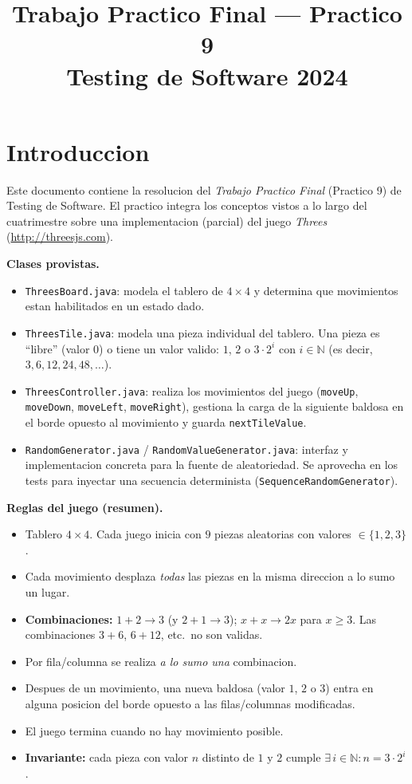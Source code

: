 \documentclass[12pt,a4paper]{article}
\title{\textbf{Trabajo Practico Final --- Practico 9}\\Testing de Software 2024}
\author{}
\date{}
\begin{document}
\maketitle
\tableofcontents
\newpage

\section*{Introduccion}

Este documento contiene la resolucion del \textit{Trabajo Practico Final} (Practico 9) de
Testing de Software. El practico integra los conceptos vistos a lo largo del cuatrimestre
sobre una implementacion (parcial) del juego \emph{Threes} (\url{http://threesjs.com}).

\textbf{Clases provistas.}

\begin{itemize}
  \item \texttt{ThreesBoard.java}: modela el tablero de $4 \times 4$ y determina que
  movimientos estan habilitados en un estado dado.
  \item \texttt{ThreesTile.java}: modela una pieza individual del tablero. Una pieza es
  ``libre'' (valor $0$) o tiene un valor valido: $1$, $2$ o $3 \cdot 2^i$ con $i \in \mathbb{N}$
  (es decir, $3, 6, 12, 24, 48, \dots$).
  \item \texttt{ThreesController.java}: realiza los movimientos del juego
  (\texttt{moveUp}, \texttt{moveDown}, \texttt{moveLeft}, \texttt{moveRight}), gestiona la
  carga de la siguiente baldosa en el borde opuesto al movimiento y guarda
  \texttt{nextTileValue}.
  \item \texttt{RandomGenerator.java} / \texttt{RandomValueGenerator.java}: interfaz y
  implementacion concreta para la fuente de aleatoriedad. Se aprovecha en los tests para
  inyectar una secuencia determinista (\texttt{SequenceRandomGenerator}).
\end{itemize}

\textbf{Reglas del juego (resumen).}

\begin{itemize}
  \item Tablero $4 \times 4$. Cada juego inicia con $9$ piezas aleatorias con valores
  $\in \{1,2,3\}$.
  \item Cada movimiento desplaza \emph{todas} las piezas en la misma direccion a lo sumo un
  lugar.
  \item \textbf{Combinaciones:} $1+2 \to 3$ (y $2+1 \to 3$); $x + x \to 2x$ para $x \ge 3$.
  Las combinaciones $3+6$, $6+12$, etc.\ no son validas.
  \item Por fila/columna se realiza \emph{a lo sumo una} combinacion.
  \item Despues de un movimiento, una nueva baldosa (valor $1$, $2$ o $3$) entra en alguna
  posicion del borde opuesto a las filas/columnas modificadas.
  \item El juego termina cuando no hay movimiento posible.
  \item \textbf{Invariante:} cada pieza con valor $n$ distinto de $1$ y $2$ cumple
  $\exists\, i \in \mathbb{N} : n = 3 \cdot 2^i$.
\end{itemize}
\end{document}
